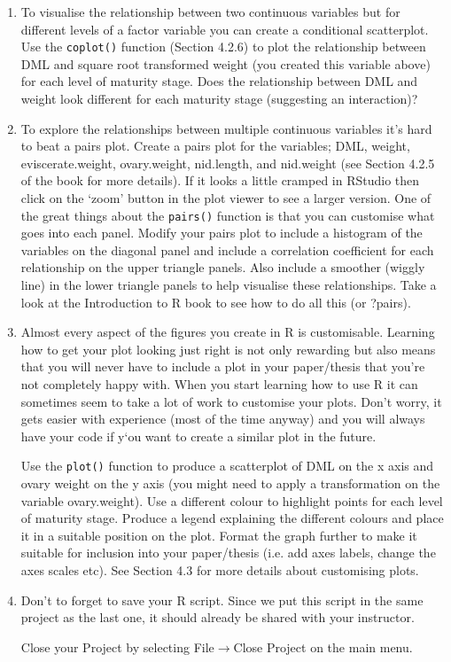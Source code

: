 \documentclass[12pt]{article}
\newcommand{\arrow}{\ensuremath{\rightarrow}}
\newcommand{\lst}[1]{\lstinline{#1}}
\begin{document}
\begin{enumerate}
 \item To visualise the relationship between two continuous variables but for different levels of a factor variable you can create a conditional scatterplot. Use the \lst{coplot()} function (Section 4.2.6) to plot the relationship between DML and square root transformed weight (you created this variable above) for each level of maturity stage. Does the relationship between DML and weight look different for each maturity stage (suggesting an interaction)?
 

 
\item To explore the relationships between multiple continuous variables it’s hard to beat a pairs plot. Create a pairs plot for the variables; DML, weight, eviscerate.weight, ovary.weight, nid.length, and nid.weight (see Section 4.2.5 of the book for more details). If it looks a little cramped in RStudio then click on the ‘zoom’ button in the plot viewer to see a larger version. One of the great things about the \lst{pairs()}
 function is that you can customise what goes into each panel. Modify your pairs plot to include a histogram of the variables on the diagonal panel and include a correlation coefficient for each relationship on the upper triangle panels. Also include a smoother (wiggly line) in the lower triangle panels to help visualise these relationships. Take a look at the Introduction to R book to see how to do all this (or ?pairs).

 

\item Almost every aspect of the figures you create in R is customisable. Learning how to get your plot looking just right is not only rewarding but also means that you will never have to include a plot in your paper/thesis that you’re not completely happy with. When you start learning how to use R it can sometimes seem to take a lot of work to customise your plots. Don’t worry, it gets easier with experience (most of the time anyway) and you will always have your code if y`ou want to create a similar plot in the future. 

Use the \lst{plot()} 
function to produce a scatterplot of DML on the x axis and ovary weight on the y axis (you might need to apply a transformation on the variable ovary.weight). Use a different colour to highlight points for each level of maturity stage. Produce a legend explaining the different colours and place it in a suitable position on the plot. Format the graph further to make it suitable for inclusion into your paper/thesis (i.e. add axes labels, change the axes scales etc). See Section 4.3 for more details about customising plots.

\item Don’t to forget to save your R script. Since we put this script in the same project
as the last one, it should already be shared with your
instructor.

Close your Project by selecting File\arrow Close Project on the main menu.

\end{enumerate}
\end{document}
